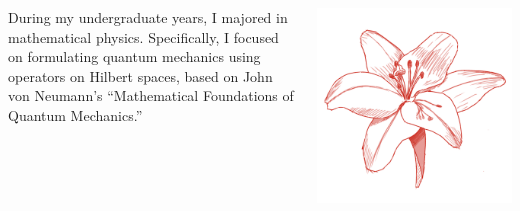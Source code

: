 \documentclass[dvipdfmx,11pt,notheorems]{beamer}
\begin{document}
\begin{frame}
  \begin{columns}[c]
    \begin{column}{0.6\textwidth}
      During my undergraduate years, I majored in mathematical physics. Specifically, I focused on formulating quantum mechanics using operators on Hilbert spaces, based on John von Neumann's ``Mathematical Foundations of Quantum Mechanics.''
    \end{column}
    \begin{column}{0.4\textwidth}
      \begin{center}
        \includegraphics[width=0.8\columnwidth]{global_okmtyuta.png}
      \end{center}
    \end{column}
  \end{columns}
\end{frame}
\end{document}
